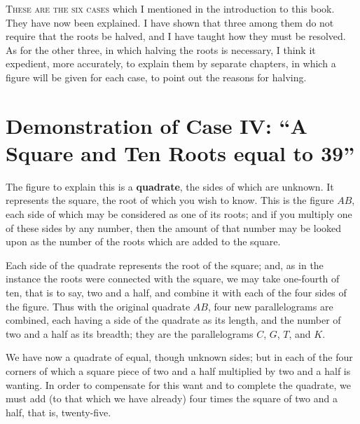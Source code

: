 \documentclass[11pt,a4paper,openany,oneside]{book}
\begin{document}
\begin{minipage}[t]{0.48\textwidth}
\raggedright

\lettrine[lines=2, lhang=0.33, nindent=0em, findent=3pt, loversize=0.14]{
\textcolor{dropgold}{T}}{hese are the six cases} which I mentioned in the introduction to this book. They have now been explained. I have shown that three among them do not require that the roots be halved, and I have taught how they must be resolved. As for the other three, in which halving the roots is necessary, I think it expedient, more accurately, to explain them by separate chapters, in which a figure will be given for each case, to point out the reasons for halving.

\section*{Demonstration of Case IV: ``A Square and Ten Roots equal to 39''}

The figure to explain this is a \textbf{quadrate}, the sides of which are unknown. It represents the square, the root of which you wish to know. This is the figure $AB$, each side of which may be considered as one of its roots; and if you multiply one of these sides by any number, then the amount of that number may be looked upon as the number of the roots which are added to the square.

Each side of the quadrate represents the root of the square; and, as in the instance the roots were connected with the square, we may take one-fourth of ten, that is to say, two and a half, and combine it with each of the four sides of the figure. Thus with the original quadrate $AB$, four new parallelograms are combined, each having a side of the quadrate as its length, and the number of two and a half as its breadth; they are the parallelograms $C$, $G$, $T$, and $K$.

We have now a quadrate of equal, though unknown sides; but in each of the four corners of which a square piece of two and a half multiplied by two and a half is wanting. In order to compensate for this want and to complete the quadrate, we must add (to that which we have already) four times the square of two and a half, that is, twenty-five.

\end{minipage}
\vspace{0.3cm}
\end{document}
